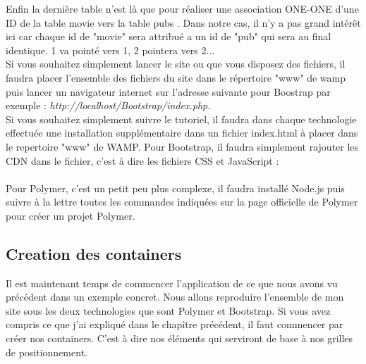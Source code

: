 \documentclass{article}
\begin{document}
Enfin la derni\`ere table n'est l\`a que pour r\'ealiser une association ONE-ONE d'une ID de la table \og movie \fg{} vers la table \og pubs \fg{}. Dans notre cas, il n'y a pas grand int\'er\^et ici car chaque id de "movie" sera attribu\'e a un id de "pub" qui sera au final identique. 1 va point\'e vers 1, 2 pointera vers 2...
\vspace{0.5cm}\\
Si vous souhaitez simplement lancer le site ou que vous disposez des fichiers, il faudra placer l'ensemble des fichiers du site dans le r\'epertoire "www" de wamp puis lancer un navigateur internet sur l'adresse suivante pour Boostrap par exemple : \textit{http://localhost/Bootstrap/index.php}.\\
Si vous souhaitez simplement suivre le tutoriel, il faudra dans chaque technologie effectu\'ee une installation suppl\'ementaire dans un fichier index.html \`a placer dans le repertoire "www" de WAMP. Pour Bootstrap, il faudra simplement rajouter les CDN dans le fichier, c'est \`a dire les fichiers CSS et JavaScript :
\vspace{0.5cm}\\
\vspace{0.5cm}\\
Pour Polymer, c'est un petit peu plus complexe, il faudra install\'e Node.js puis suivre \`a la lettre toutes les commandes indiqu\'ees sur la page officielle de Polymer pour cr\'eer un projet Polymer.

\subsection{Creation des containers}

Il est maintenant temps de commencer l'application de ce que nous avons vu pr\'ec\'edent dans un exemple concret. Nous allons reproduire l'ensemble de mon site sous les deux technologies que sont Polymer et Bootstrap. Si vous avez compris ce que j'ai expliqu\'e dans le chap\^itre pr\'ec\'edent, il faut commencer par cr\'eer nos containers. C'est \`a dire nos \'el\'ements qui serviront de base \`a nos grilles de positionnement.\\
\end{document}
